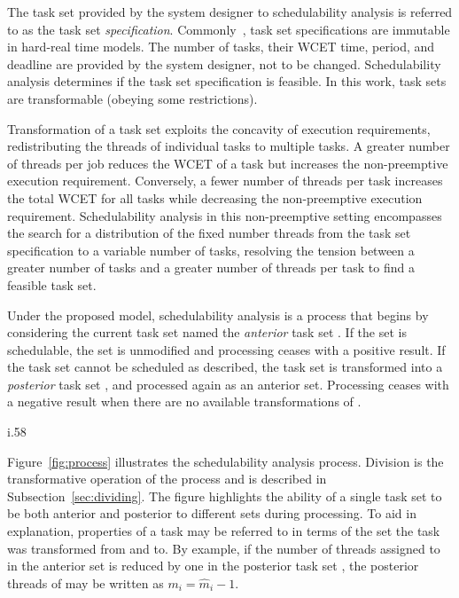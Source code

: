The task set \tasks{} provided by the system designer to
schedulability analysis is referred to as the task set
\emph{specification}. Commonly~\cite{Baruah:1990,Liu:1973,Baruah:2005,Bertogna:2011,Burns:1995,Buttazzo:2011}, task set specifications are immutable
in hard-real time models. The number of tasks, their
WCET time, period, and deadline are provided by the system
designer, not to be changed. Schedulability analysis determines if
the task set specification is feasible. In this work, task sets are
transformable (obeying some restrictions).

Transformation of a task set exploits the concavity of execution
requirements, redistributing the threads of individual tasks to
multiple tasks. A greater number of threads per job reduces the WCET
of a task but increases the non-preemptive execution
requirement. Conversely, a fewer number of threads per task increases
the total WCET for all tasks while decreasing the non-preemptive
execution requirement. Schedulability analysis in this non-preemptive
setting  encompasses the search for a distribution of the fixed number
threads from the task set specification to a variable number of tasks,
resolving the tension between a greater number of tasks and a
greater number of threads per task to find a feasible task set. 
 
Under the proposed model, schedulability analysis is a process that
begins by considering the current task set named the \emph{anterior}
task set \supts{}. If the set is schedulable, the set is unmodified and
processing ceases with a positive result. If the task set \supts{}
cannot be scheduled as described, the task set is transformed into a
\emph{posterior} task set \tasks{}, and processed again as an anterior
set. Processing ceases with a negative result when there are no
available transformations of \supts{}.

\begin{wrapfigure}[8]{i}{.58\linewidth}
  \centering
  
  \caption{Schedulability and Transformable Task Sets}
  \label{fig:process}
\end{wrapfigure}

Figure~\ref{fig:process} illustrates the schedulability analysis
process. Division is the transformative operation of the process and
is described in Subsection~\ref{sec:dividing}. The figure highlights the
ability of a single task set to be both anterior and posterior to
different sets during processing. To aid in explanation, properties of a
task may be referred to in terms of the set the task was transformed
from and to. By example, if the number of threads assigned to 
in the anterior set \supts{} is reduced by one in the posterior task
set \tasks{}, the posterior threads of  may be written as
${m_i = \hat{m}_i - 1}$.


